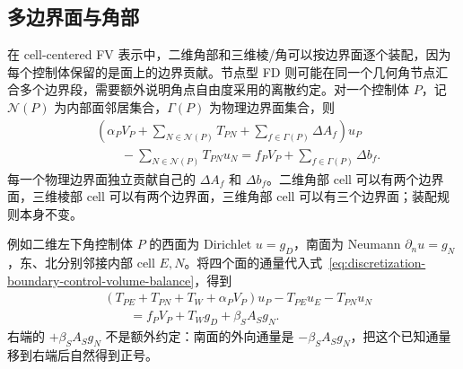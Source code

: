 \subsection{多边界面与角部}

在 cell-centered FV 表示中，二维角部和三维棱/角可以按边界面逐个装配，因为每个控制体保留的是面上的边界贡献。节点型 FD 则可能在同一个几何角节点汇合多个边界段，需要额外说明角点自由度采用的离散约定。对一个控制体 $P$，记 $\mathcal N(P)$ 为内部面邻居集合，$\Gamma(P)$ 为物理边界面集合，则
\begin{equation}
\boxed{
\begin{aligned}
&\left(
\alpha_PV_P
+\sum_{N\in\mathcal N(P)}T_{PN}
+\sum_{f\in\Gamma(P)}\Delta A_f
\right)u_P\\
&\qquad
-\sum_{N\in\mathcal N(P)}T_{PN}u_N
=
f_PV_P
+\sum_{f\in\Gamma(P)}\Delta b_f.
\end{aligned}
}
\label{eq:discretization-general-boundary-row}
\end{equation}
每一个物理边界面独立贡献自己的 $\Delta A_f$ 和 $\Delta b_f$。二维角部 cell 可以有两个边界面，三维棱部 cell 可以有两个边界面，三维角部 cell 可以有三个边界面；装配规则本身不变。

例如二维左下角控制体 $P$ 的西面为 Dirichlet $u=g_D$，南面为 Neumann $\partial_nu=g_N$，东、北分别邻接内部 cell $E,N$。将四个面的通量代入式~\eqref{eq:discretization-boundary-control-volume-balance}，得到
\begin{equation}
\boxed{
\begin{aligned}
&\left(T_{PE}+T_{PN}+T_W+\alpha_PV_P\right)u_P
-T_{PE}u_E-T_{PN}u_N\\
&\qquad
=f_PV_P+T_Wg_D+\beta_SA_Sg_N.
\end{aligned}
}
\label{eq:discretization-mixed-corner-row}
\end{equation}
右端的 $+\beta_SA_Sg_N$ 不是额外约定：南面的外向通量是 $-\beta_SA_Sg_N$，把这个已知通量移到右端后自然得到正号。

